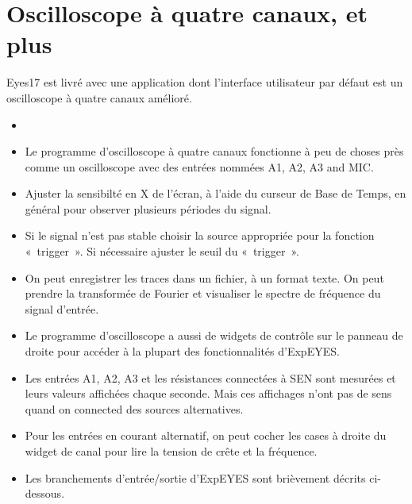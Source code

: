 \documentclass[a4paper,12pt,french]{sphinxmanual}
\begin{document}
\section{Oscilloscope à quatre canaux, et plus}
\label{\detokenize{3.1:oscilloscope-a-quatre-canaux-et-plus}}\label{\detokenize{3.1::doc}}
Eyes17 est livré avec une application dont l’interface utilisateur par défaut
est un oscilloscope à quatre canaux amélioré.
\begin{itemize}
\item {} 

\item {} 
Le programme d’oscilloscope à quatre canaux fonctionne à peu de choses
près comme un oscilloscope avec des entrées nommées
A1, A2, A3 and MIC.

\item {} 
Ajuster la sensibilté en X de l’écran, à l’aide du curseur de Base de Temps,
en général pour observer plusieurs périodes du signal.

\item {} 
Si le signal n’est pas stable choisir la source appropriée pour la fonction
« trigger ». Si nécessaire ajuster le seuil du « trigger ».

\item {} 
On peut enregistrer les traces dans un fichier, à un format texte. On peut
prendre la transformée de Fourier et visualiser le spectre de fréquence
du signal d’entrée.

\item {} 
Le programme d’oscilloscope a aussi de widgets de contrôle sur le panneau
de droite pour accéder à la plupart des fonctionnalités d’ExpEYES.

\item {} 
Les entrées A1, A2, A3 et les résistances connectées à SEN sont
mesurées et leurs valeurs affichées chaque seconde. Mais ces affichages
n’ont pas de sens quand on connected des sources alternatives.

\item {} 
Pour les entrées en courant alternatif, on peut cocher les cases à droite
du widget de canal pour lire la tension de crête et la fréquence.

\item {} 
Les branchements d’entrée/sortie d’ExpEYES sont brièvement décrits
ci-dessous.

\end{itemize}
\end{document}

